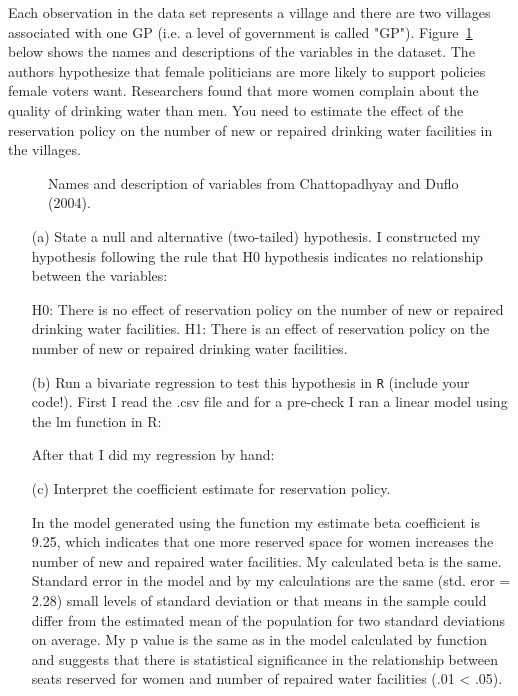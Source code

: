 \documentclass[12pt,letterpaper]{article}
\begin{document}
\noindent Each observation in the data set represents a village and there are two villages associated with one GP (i.e. a level of government is called "GP"). Figure~\ref{fig:women_desc} below shows the names and descriptions of the variables in the dataset. The authors hypothesize that female politicians are more likely to support policies female voters want. Researchers found that more women complain about the quality of drinking water than men. You need to estimate the effect of the reservation policy on the number of new or repaired drinking water facilities in the villages.
\vspace{.5cm}
\begin{figure}[h!]
	\caption{\footnotesize{Names and description of variables from Chattopadhyay and Duflo (2004).}}
	\vspace{.5cm}
	\centering
	\label{fig:women_desc}
\end{figure}		

\newpage
\begin{enumerate}
	\item [(a)] State a null and alternative (two-tailed) hypothesis. 
	I constructed my hypothesis following the rule that H0 hypothesis indicates no relationship between the variables:
	
	H0: There is no effect of reservation policy on the number of new or repaired drinking water facilities.
	H1: There is an effect of reservation policy on the number of new or repaired drinking water facilities.
	
	\vspace{6cm}
	\item [(b)] Run a bivariate regression to test this hypothesis in \texttt{R} (include your code!).
	First I read the .csv file and for a pre-check I ran a linear model using the lm function in R: 
	
	
	
	After that I did my regression by hand:
	
	 
	
	\vspace{1cm}
	\item [(c)] Interpret the coefficient estimate for reservation policy.
	
	In the model generated using the function my estimate beta coefficient is 9.25, which indicates that one more reserved space for women increases the number of new and repaired water facilities. My calculated beta is the same. Standard error in the model and by my calculations are the same (std. eror = 2.28) small levels of standard deviation or that means in the sample could differ from the estimated mean of the population for two standard deviations on average. My p value is the same as in the model calculated by function and suggests that there is statistical significance in the relationship between seats reserved for women and number of repaired water facilities (.01 < .05).
	
	 
\end{enumerate}
\end{document}
